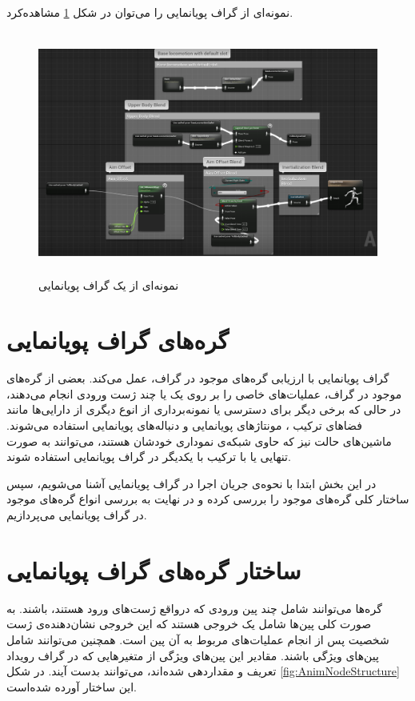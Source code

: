نمونه‌ای از گراف پویانمایی را می‌توان در شکل 
\ref{fig:AnimationGraph}
مشاهده‌کرد.

\begin{figure}[ht]
	\centerline{\includegraphics[width=\textwidth,height=8cm,keepaspectratio]{Figures/Ch3/AnimationGraph.png}}

	\caption{نمونه‌ای از یک گراف پویانمایی}
	\label{fig:AnimationGraph}
\end{figure}


\section{گره‌های گراف پویانمایی }

گراف پویا‌نمایی با ارزیابی گره‌های موجود در گراف، عمل می‌کند.
بعضی از گره‌های موجود در گراف، عملیات‌های خاصی را بر روی یک یا چند
ژست ورودی انجام می‌دهند، در حالی که برخی دیگر 
برای دسترسی یا نمونه‌برداری از انوع دیگری از دارایی‌ها مانند
فضاهای ترکیب
، مونتاژهای پویانمایی
و دنباله‌های پویا‌نمایی
استفاده می‌شوند.
ماشین‌های حالت نیز که حاوی شبکه‌ی نموداری خودشان هستند، می‌توانند 
به صورت تنهایی یا با ترکیب با یکدیگر در 
گراف پویانمایی استفاده شوند.

در این بخش ابتدا با نحوه‌‌ی جریان اجرا در گراف پویانمایی 
آشنا می‌شویم، سپس ساختار کلی گره‌های موجود را بررسی کرده و در نهایت 
به بررسی انواع گره‌‌های موجود در گراف پویانمایی می‌پردازیم.



\section{ساختار گره‌های گراف پویانمایی}

گره‌‌ها می‌توانند شامل چند پین ورودی که درواقع ژست‌های ورود هستند، باشند.
به صورت کلی پین‌ها شامل یک خروجی هستند که این خروجی نشان‌دهنده‌ی 
ژست شخصیت پس از انجام عملیات‌های مربوط به آن پین است.
همچنین می‌توانند شامل پین‌های ویژگی باشند. مقادیر این پین‌های ویژگی از 
متغیر‌هایی که در گراف رویداد تعریف و مقداردهی شده‌اند، می‌توانند بدست آیند.
در شکل 
\ref{fig:AnimNodeStructure}
این ساختار آورده شده‌است.

